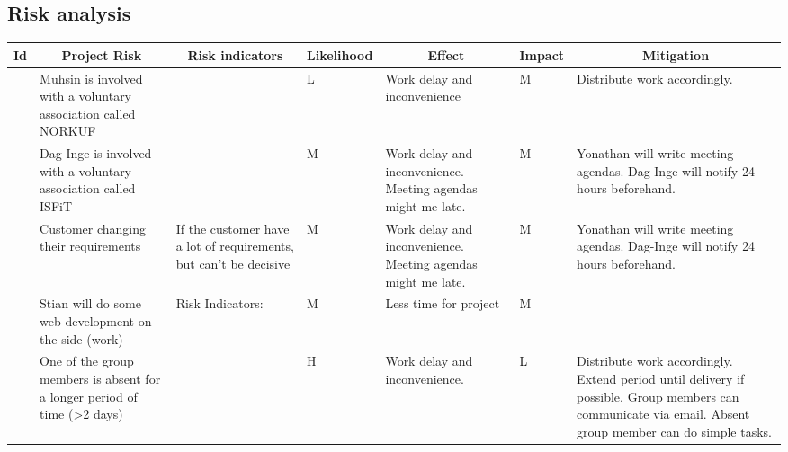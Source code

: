 \begin{landscape}
\subsection{Risk analysis}

\centering
\begin{longtable}{| p{0.4cm} | p{4cm} | p{4cm} | p{2cm} | p{4cm} | p{1cm} | p{4cm} |}
	\hline
		\multicolumn{1}{|c|}{ Id}   &
        \multicolumn{1}{c|}{ Project Risk}  &
		\multicolumn{1}{c|}{ Risk indicators}  &
		\multicolumn{1}{c|}{ Likelihood} &
		\multicolumn{1}{c|}{ Effect} &
		\multicolumn{1}{c|}{ Impact} &
		\multicolumn{1}{c|}{ Mitigation} \\
		\hline \hline
	\endhead

	\newcounter{riskId}

	\stepcounter{riskId}
	\centering
		\arabic{riskId} &
        Muhsin is involved with a voluntary association called NORKUF &
		&
		\centering L &
		Work delay and inconvenience &
		\centering M &
		Distribute work accordingly. \\
	\hline

	\stepcounter{riskId}
	\centering
		\arabic{riskId} &
        Dag-Inge is involved with a voluntary association called ISFiT &
		& \centering M &
		Work delay and inconvenience. Meeting agendas might me late. &
		\centering  M &
		Yonathan will write meeting agendas. Dag-Inge will notify 24 hours beforehand. \\
	\hline

	\stepcounter{riskId}
	\centering
		\arabic{riskId} &
        Customer changing their requirements &
		If the customer have a lot of requirements, but can’t be decisive &
		\centering M &
		Work delay and inconvenience. Meeting agendas might me late. &
		\centering  M &
		Yonathan will write meeting agendas. Dag-Inge will notify 24 hours beforehand. \\
	\hline

	\stepcounter{riskId}
	\centering
		\arabic{riskId} &
        Stian will do some web development on the side (work) &
		Risk Indicators: &
		\centering M &
		Less time for project &
		\centering M & \\
	\hline

	\stepcounter{riskId}
	\centering
		\arabic{riskId} &
        One of the group members is absent for a longer period of time (>2 days) &
		& \centering H &
		Work delay and inconvenience. &
		\centering  L &
		Distribute work accordingly. Extend period until delivery if possible. Group members can communicate via email. Absent group member can do simple tasks. \\
	\hline


\end{longtable}
\end{landscape}
